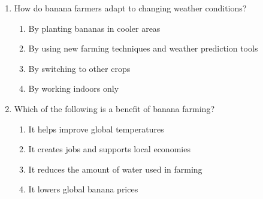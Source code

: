 \documentclass[12pt]{article}
\begin{document}
\begin{enumerate}
    \vspace{0.5cm}

    \item How do banana farmers adapt to changing weather conditions?

    \begin{enumerate}[label=\Alph*.]
        \item By planting bananas in cooler areas
        \item By using new farming techniques and weather prediction tools
        \item By switching to other crops
        \item By working indoors only
    \end{enumerate}
    
    \vspace{0.5cm}

    \item Which of the following is a benefit of banana farming?

    \begin{enumerate}[label=\Alph*.]
        \item It helps improve global temperatures
        \item It creates jobs and supports local economies
        \item It reduces the amount of water used in farming
        \item It lowers global banana prices
    \end{enumerate}

    \vspace{0.5cm}
    
\end{enumerate}
\end{document}
